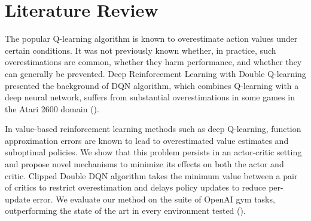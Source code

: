 \documentclass{article}
\begin{document}
\section{Literature Review}

The popular Q-learning algorithm is known to overestimate action values under certain conditions. It was not previously known whether, in practice, such overestimations are common, whether they harm performance, and whether they can generally be prevented. Deep Reinforcement Learning with Double Q-learning presented the background of DQN algorithm, which combines Q-learning with a deep neural network, suffers from substantial overestimations in some games in the Atari 2600 domain (\citet{mnih2013playing}).


In value-based reinforcement learning methods such as deep Q-learning, function approximation errors are known to lead to overestimated value estimates and suboptimal policies. We show that this problem persists in an actor-critic setting and propose novel mechanisms to minimize its effects on both the actor and critic. Clipped Double DQN algorithm takes the minimum value between a pair of critics to restrict overestimation and delays policy updates to reduce per-update error. We evaluate our method on the suite of OpenAI gym tasks, outperforming the state of the art in every environment tested (\citet{fujimoto2018addressing}).





\end{document}
